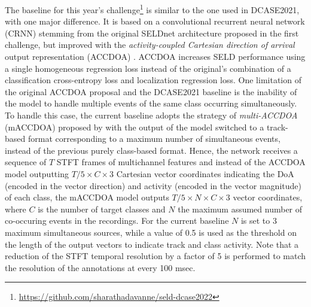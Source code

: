 \documentclass{article}
\begin{document}
\begin{sloppy}
The baseline for this year's challenge\footnote{\url{https://github.com/sharathadavanne/seld-dcase2022}} is similar to the one used in DCASE2021, with one major difference. It is based on a convolutional recurrent neural network (CRNN) stemming from the original SELDnet architecture \cite{adavanne2018sound} proposed in the first challenge, but improved with the \emph{activity-coupled Cartesian direction of arrival} output representation (ACCDOA) \cite{shimada2021accdoa}. ACCDOA increases SELD performance using a single homogeneous regression loss instead of the original's combination of a classification cross-entropy loss and localization regression loss. One limitation of the original ACCDOA proposal and the DCASE2021 baseline is the inability of the model to handle multiple events of the same class occurring simultaneously. To handle this case, the current baseline adopts the strategy of \emph{multi-ACCDOA} (mACCDOA) proposed by \cite{shimada2022multi} with the output of the model switched to a track-based format corresponding to a maximum number of simultaneous events, instead of the previous purely class-based format. Hence, the network receives a sequence of $T$ STFT frames of multichannel features and instead of the ACCDOA model outputting $T/5\times C \times 3$ Cartesian vector coordinates indicating the DoA (encoded in the vector direction) and activity (encoded in the vector magnitude) of each class, the mACCDOA model outputs $T/5\times N\times C \times 3$ vector coordinates, where $C$ is the number of target classes and $N$ the maximum assumed number of co-occuring events in the recordings. For the current baseline $N$ is set to 3 maximum simultaneous sources, while a value of 0.5 is used as the threshold on the length of the output vectors to indicate track and class activity. Note that a reduction of the STFT temporal resolution by a factor of 5 is performed to match the resolution of the annotations at every 100 msec.


\end{sloppy}
\end{document}
